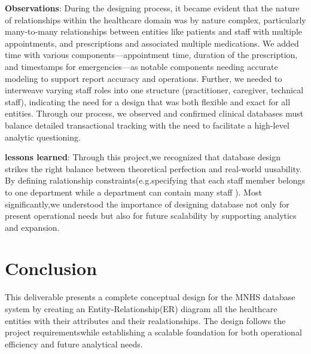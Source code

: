 \documentclass[a4paper,12pt]{article}
\begin{document}
\textbf{Observations}:
During the designing process, it became evident that the nature of relationships within the healthcare domain was by nature complex, particularly many-to-many relationships between entities like patients and staff with multiple appointments, and prescriptions and associated multiple medications. We added time with various components—appointment time, duration of the prescription, and timestamps for emergencies—as notable components needing accurate modeling to support report accuracy and operations. Further, we needed to interweave varying staff roles into one structure (practitioner, caregiver, technical staff), indicating the need for a design that was both flexible and exact for all entities. Through our process, we observed and confirmed clinical databases must balance detailed transactional tracking with the need to facilitate a high-level analytic questioning.

\textbf{lessons learned}:
Through this project,we recognized that database design strikes the right balance between theoretical perfection and real-world uusability.
By defining ralationship constraints(e.g.specifying that each staff member belongs to one department while a department can contain many staff ).
Most significantly,we understood the importance of designing database not only for present operational needs but also for future scalability by supporting analytics and expansion.

\section{Conclusion}
This deliverable presents a complete conceptual design for the MNHS database system by creating an Entity-Relationship(ER) diagram all the healthcare entities with their attributes and their realationships.
The design follows the project requirementswhile establishing a scalable foundation for both
operational efficiency and future analytical needs.
\end{document}
